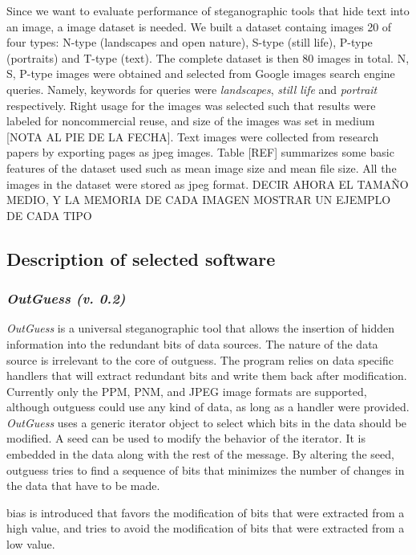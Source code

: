 \documentclass[11pt]{article}
\begin{document}
Since we want to evaluate performance of steganographic tools that hide text into an image, a image dataset is needed.
We built a dataset containg images 20 of four types: N-type (landscapes and open nature), S-type (still life), P-type (portraits) and
T-type (text). The complete dataset is then 80 images in total. N, S, P-type images were obtained and selected from Google images search engine queries.
Namely, keywords for queries were \textit{landscapes}, \textit{still life} and \textit{portrait} respectively.
Right usage for the images was selected such that results were labeled for noncommercial reuse, and size of the images was set in 
medium [NOTA AL PIE DE LA FECHA]. Text images were collected from research papers by exporting pages as jpeg images.
Table [REF] summarizes some basic features of the dataset used such as mean image size and mean file size. All the
images in the dataset were stored as jpeg format. DECIR AHORA EL TAMAÑO MEDIO, Y LA MEMORIA DE CADA IMAGEN
MOSTRAR UN EJEMPLO DE CADA TIPO



\subsection{Description of selected software}

\subsubsection{\textit{OutGuess (v. 0.2)}}
\textit{OutGuess} is  a  universal  steganographic  tool  that  allows  the  insertion  of  hidden information  into  the  
redundant  bits of data sources.  The nature of the data source is irrelevant to the core of outguess.  The program relies on  
data  specific  handlers  that will  extract  redundant  bits  and write them back after modification. Currently only the PPM, 
PNM, and JPEG image formats are supported, although outguess could use  any  kind  of data, as long as a handler were provided.
\textit{OutGuess} uses  a  generic  iterator  object  to  select  which bits in the data should be modified.  A seed can be used 
to modify the behavior of the iterator. It  is  embedded  in the data along with the rest of the message.  
By altering the seed, outguess tries to find a sequence of bits that minimizes the number of changes in the data that have to be 
made.

\textitA bias is introduced that favors the modification of bits that were extracted from a  high value, and tries to avoid the 
modification of bits that were extracted from a low value.
\end{document}
